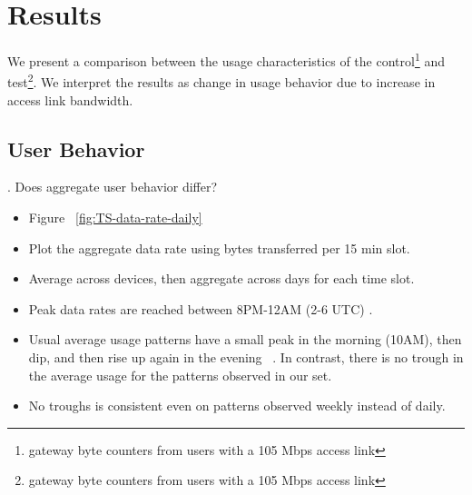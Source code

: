 \section{Results}
\label{sec:results}


We present a comparison between the usage characteristics of the control\footnote{gateway byte counters from users with a 105 Mbps access link} and test\footnote{gateway byte counters from users with a 105 Mbps access link}. We interpret the results as change in usage behavior due to increase in access link bandwidth. %


\subsection{User Behavior}
\label{subsec:behavior}

. Does aggregate user behavior differ?


\begin{itemize}
\itemsep0em 
\item Figure ~\ref{fig:TS-data-rate-daily}
\item Plot the aggregate data rate using bytes transferred per 15 min slot. 
\item Average across devices, then aggregate across days for each time slot.
\item Peak data rates are reached between 8PM-12AM (2-6 UTC) .
\item Usual average usage patterns have a small peak in the morning (10AM), then dip, and then rise up again in the evening ~\cite{sandvine2014report1}. In contrast, there is no trough in the average usage for the patterns observed in our set.
\item No troughs is consistent even on patterns observed weekly instead of daily.
\end{itemize}


